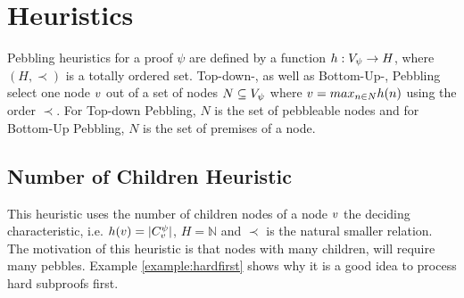 \documentclass{llncs}
\begin{document}
\section{Heuristics}
\label{sec:heuristics}
Pebbling heuristics for a proof $\psi$ are defined by a function $h: V_{\psi} \rightarrow H$, where $(H,\prec)$ is a totally ordered set. 
Top-down-, as well as Bottom-Up-, Pebbling select one node $v$ out of a set of nodes $N \subseteq V_{\psi}$ where $v = max_{n \in N} h(n)$ using the order $\prec$.
For Top-down Pebbling, $N$ is the set of pebbleable nodes and for Bottom-Up Pebbling, $N$ is the set of premises of a node.

\subsection{Number of Children Heuristic}

This heuristic uses the number of children nodes of a node $v$ the deciding characteristic, i.e. $h(v) = |C_{v}^{\psi}|$, $H = \mathbb{N}$ and $\prec$ is the natural smaller relation.\\
The motivation of this heuristic is that nodes with many children, will require many pebbles. Example \ref{example:hardfirst} shows why it is a good idea to process hard subproofs first.
\end{document}
